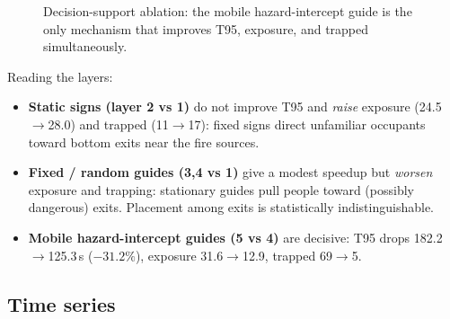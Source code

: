 \documentclass[11pt,a4paper]{article}
\newcommand{\Bar}[3]{%
  \fill[#3] (#1-0.6,0) rectangle (#1+0.6,#2);
  \node[above,font=\scriptsize] at (#1,#2) {#2};
}
\begin{document}
\begin{figure}[h]
\centering
{}
\caption{Decision-support ablation: the mobile hazard-intercept guide is the only mechanism that
improves T95, exposure, and trapped simultaneously.}
\end{figure}

Reading the layers:
\begin{itemize}[leftmargin=1.4em,itemsep=2pt]
\item \textbf{Static signs (layer 2 vs 1)} do not improve T95 and \emph{raise} exposure
(24.5$\to$28.0) and trapped (11$\to$17): fixed signs direct unfamiliar occupants toward bottom
exits near the fire sources.
\item \textbf{Fixed / random guides (3,4 vs 1)} give a modest speedup but \emph{worsen} exposure
and trapping: stationary guides pull people toward (possibly dangerous) exits. Placement among
exits is statistically indistinguishable.
\item \textbf{Mobile hazard-intercept guides (5 vs 4)} are decisive: T95 drops 182.2$\to$125.3\,s
($-31.2\%$), exposure 31.6$\to$12.9, trapped 69$\to$5.
\end{itemize}

\subsection{Time series}
\end{document}
